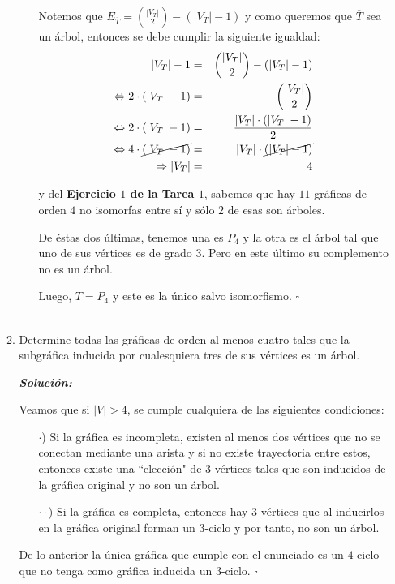 \documentclass{article}
\begin{document}
\begin{enumerate}
\begin{enumerate}
\begin{itemize}
            Notemos que $E_{\overline{T}} = {|V_T| \choose 2} - (|V_T| -1)$ y
            como queremos que $\overline{T}$ sea un árbol, entonces se debe cumplir
            la siguiente igualdad:
            \begin{eqnarray*}
              |V_T| -1 &=& {|V_T| \choose 2} - (|V_T| -1)\\
              \Leftrightarrow 2 \cdot (|V_T| -1) &=& {|V_T| \choose 2}\\
              \Leftrightarrow 2 \cdot (|V_T| -1) &=& \frac{|V_T| \cdot (|V_T| -1)}{2}\\
              \Leftrightarrow 4 \cdot \cancel{(|V_T| -1)} &=& |V_T| \cdot \cancel{(|V_T| -1)}\\
              \Rightarrow |V_T| &=& 4
            \end{eqnarray*}

            y del \textbf{Ejercicio $1$ de la Tarea $1$}, sabemos que hay $11$ gráficas
            de orden $4$ no isomorfas entre sí y sólo $2$ de esas son árboles.

            De \'estas dos \'ultimas, tenemos una es $P_4$ y la otra es el árbol
            tal que uno de sus vértices es de grado $3$. Pero en este último su
            complemento no es un árbol.

            Luego, $T = P_4$ y este es la único salvo isomorfismo.
            \hfill $\square$ \\
            \\
        \end{itemize}

      \item Determine todas las gr\'aficas de orden al
        menos cuatro tales que la subgr\'afica inducida por
        cualesquiera tres de sus v\'ertices es un \'arbol.

        \textbf{\textit{Soluci\'on:}}

        Veamos que si $|V| > 4$, se cumple cualquiera de las siguientes condiciones:
        \begin{itemize}
          \item[$\cdot$)] Si la gráfica es incompleta, existen al menos dos vértices
            que no se conectan mediante una arista y si no existe trayectoria entre estos,
            entonces existe una ``elección" de $3$ vértices tales que son inducidos de
            la gráfica original y no son un árbol.

          \item[$\cdot \cdot$)] Si la gráfica es completa, entonces hay $3$ vértices que
            al inducirlos en la gráfica original forman un $3$-ciclo y por tanto, no son un árbol.
        \end{itemize}
        De lo anterior la única gráfica que cumple con el enunciado es un $4$-ciclo
        que no tenga como gráfica inducida un $3$-ciclo.
        \hfill $\square$ \\
        \\
      \end{enumerate}
  \end{enumerate}
\end{document}
